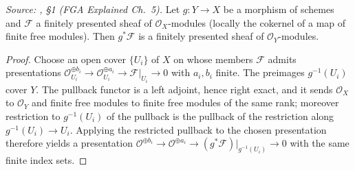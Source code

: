 \begin{lemma}\leanok
  \label{lem:pullback_finite_presentation}
  \textit{Source: \cite{nitsure-hilbert-quot}, \S 1 (FGA Explained Ch.~5).}
  Let \(g : Y \to X\) be a morphism of schemes and \(\mathcal{F}\) a finitely
  presented sheaf of \(\mathcal{O}_X\)-modules (locally the cokernel of a map
  of finite free modules).  Then \(g^* \mathcal{F}\) is a finitely presented
  sheaf of \(\mathcal{O}_Y\)-modules.
\end{lemma}
\begin{proof}\leanok
  Choose an open cover \(\{U_i\}\) of \(X\) on whose members \(\mathcal{F}\)
  admits presentations
  \(\mathcal{O}_{U_i}^{\oplus b_i} \to \mathcal{O}_{U_i}^{\oplus a_i} \to
  \mathcal{F}|_{U_i} \to 0\) with \(a_i, b_i\) finite.  The preimages
  \(g^{-1}(U_i)\) cover \(Y\).  The pullback functor is a left adjoint, hence
  right exact, and it sends \(\mathcal{O}_X\) to \(\mathcal{O}_Y\) and finite
  free modules to finite free modules of the same rank; moreover restriction
  to \(g^{-1}(U_i)\) of the pullback is the pullback of the restriction along
  \(g^{-1}(U_i) \to U_i\).  Applying the restricted pullback to the chosen
  presentation therefore yields a presentation
  \(\mathcal{O}^{\oplus b_i} \to \mathcal{O}^{\oplus a_i} \to
  (g^*\mathcal{F})|_{g^{-1}(U_i)} \to 0\) with the same finite index sets.
\end{proof}

